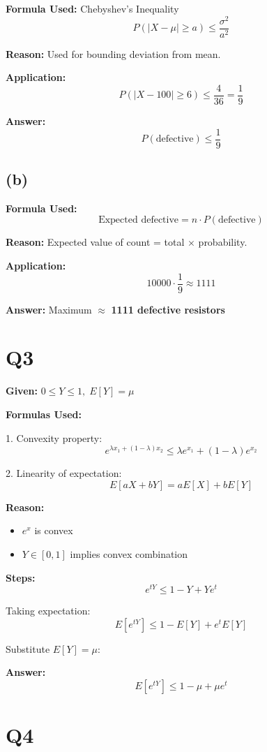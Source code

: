 \documentclass[12pt]{article}
\begin{document}
\textbf{Formula Used:} Chebyshev’s Inequality
\[
P(|X - \mu| \ge a) \le \frac{\sigma^2}{a^2}
\]

\textbf{Reason:} Used for bounding deviation from mean.

\textbf{Application:}
\[
P(|X - 100| \ge 6) \le \frac{4}{36} = \frac{1}{9}
\]

\textbf{Answer:}
\[
P(\text{defective}) \le \frac{1}{9}
\]

\subsection*{(b)}

\textbf{Formula Used:}
\[
\text{Expected defective} = n \cdot P(\text{defective})
\]

\textbf{Reason:} Expected value of count = total $\times$ probability.

\textbf{Application:}
\[
10000 \cdot \frac{1}{9} \approx 1111
\]

\textbf{Answer:} Maximum $\approx$ \textbf{1111 defective resistors}

\section*{Q3}

\textbf{Given:} $0 \le Y \le 1,\; E[Y] = \mu$

\textbf{Formulas Used:}

1. Convexity property:
\[
e^{\lambda x_1 + (1-\lambda)x_2} \le \lambda e^{x_1} + (1-\lambda)e^{x_2}
\]

2. Linearity of expectation:
\[
E[aX + bY] = aE[X] + bE[Y]
\]

\textbf{Reason:}
\begin{itemize}
\item $e^x$ is convex
\item $Y \in [0,1]$ implies convex combination
\end{itemize}

\textbf{Steps:}
\[
e^{tY} \le 1 - Y + Y e^t
\]

Taking expectation:
\[
E[e^{tY}] \le 1 - E[Y] + e^t E[Y]
\]

Substitute $E[Y] = \mu$:

\textbf{Answer:}
\[
E[e^{tY}] \le 1 - \mu + \mu e^t
\]

\section*{Q4}
\end{document}
